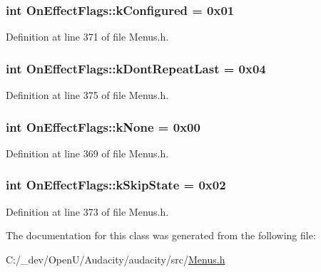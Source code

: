\subsubsection[{\texorpdfstring{k\+Configured}{kConfigured}}]{ {\bf int} On\+Effect\+Flags\+::k\+Configured = 0x01\hspace{0.3cm}{\ttfamily [static]}}\hypertarget{class_on_effect_flags_a7552392a395f22f702c1e2c28d2b6020}{}\label{class_on_effect_flags_a7552392a395f22f702c1e2c28d2b6020}


Definition at line 371 of file Menus.\+h.

\subsubsection[{\texorpdfstring{k\+Dont\+Repeat\+Last}{kDontRepeatLast}}]{ {\bf int} On\+Effect\+Flags\+::k\+Dont\+Repeat\+Last = 0x04\hspace{0.3cm}{\ttfamily [static]}}\hypertarget{class_on_effect_flags_abec1568e4528abe0fccf301b10e715b6}{}\label{class_on_effect_flags_abec1568e4528abe0fccf301b10e715b6}


Definition at line 375 of file Menus.\+h.

\subsubsection[{\texorpdfstring{k\+None}{kNone}}]{ {\bf int} On\+Effect\+Flags\+::k\+None = 0x00\hspace{0.3cm}{\ttfamily [static]}}\hypertarget{class_on_effect_flags_acfc5e2001fbe03eeda04c7ee4dd7e6d0}{}\label{class_on_effect_flags_acfc5e2001fbe03eeda04c7ee4dd7e6d0}


Definition at line 369 of file Menus.\+h.

\subsubsection[{\texorpdfstring{k\+Skip\+State}{kSkipState}}]{ {\bf int} On\+Effect\+Flags\+::k\+Skip\+State = 0x02\hspace{0.3cm}{\ttfamily [static]}}\hypertarget{class_on_effect_flags_a14f35f5193a26b0ca79db2b83a4bee2a}{}\label{class_on_effect_flags_a14f35f5193a26b0ca79db2b83a4bee2a}


Definition at line 373 of file Menus.\+h.



The documentation for this class was generated from the following file\+:\begin{DoxyCompactItemize}
\item 
C\+:/\+\_\+dev/\+Open\+U/\+Audacity/audacity/src/\hyperlink{_menus_8h}{Menus.\+h}\end{DoxyCompactItemize}

